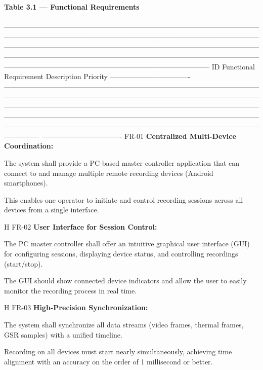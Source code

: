 \textbf{Table 3.1 --- Functional Requirements}
 --------------------------------------------------------------------------------------------------------------------------------------------------------------------------------------------------------------------------------------------------------------------------------------------------------------------------------------------------------------------------------------------------------------------------------------------------------------------------------------------------------------------------------------------------------------------------------------------------------------------------------------------------- ID Functional Requirement Description Priority ---------------------------------- --------------------------------------------------------------------------------------------------------------------------------------------------------------------------------------------------------------------------------------------------------------------------------------------------------------------------------------------------------------------------------------------------------------------------------------------------------------------------------------------------------------------------------------------------------------------------- ---------------------------------- FR-01 \textbf{Centralized Multi-Device Coordination:}

The system shall provide a PC-based master controller application that can connect to and manage multiple remote recording devices (Android smartphones).

This enables one operator to initiate and control recording sessions across all devices from a single interface.

H FR-02 \textbf{User Interface for Session Control:}

The PC master controller shall offer an intuitive graphical user interface (GUI) for configuring sessions, displaying device status, and controlling recordings (start/stop).

The GUI should show connected device indicators and allow the user to easily monitor the recording process in real time.

H FR-03 \textbf{High-Precision Synchronization:}

The system shall synchronize all data streams (video frames, thermal frames, GSR samples) with a unified timeline.

Recording on all devices must start nearly simultaneously, achieving time alignment with an accuracy on the order of 1 millisecond or better.

